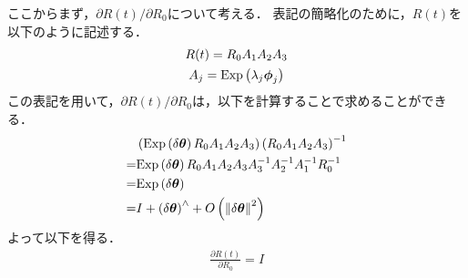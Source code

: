 ここからまず，$\partial R(t) / \partial R_{0}$について考える．
表記の簡略化のために，$R(t)$を以下のように記述する．
%
\begin{align}
  \begin{gathered}
    R(t) = R_{0} A_{1} A_{2} A_{3} \\
    A_{j} = {\rm Exp} \left( \lambda_{j} \boldsymbol \phi_{j} \right)
  \end{gathered}
\end{align}
%
この表記を用いて，$\partial R(t) / \partial R_{0}$は，以下を計算することで求めることができる．
%
\begin{align}
  \begin{split}
    & \left( {\rm Exp} \left( \delta \boldsymbol \theta \right) R_{0} A_{1} A_{2} A_{3} \right) \left( R_{0} A_{1} A_{2} A_{3} \right)^{-1} \\
  = & {\rm Exp} \left( \delta \boldsymbol \theta \right) R_{0} A_{1} A_{2} A_{3} A_{3}^{-1} A_{2}^{-1} A_{1}^{-1} R_{0}^{-1} \\
  = & {\rm Exp} \left( \delta \boldsymbol \theta \right) \\
  = & I + \left( \delta \boldsymbol \theta \right)^{\wedge} + O \left( \left\| \delta \boldsymbol \theta \right\|^{2} \right)
  \end{split}
\end{align}
%
よって以下を得る．
%
\begin{align}
  \frac{ \partial R(t) }{ \partial R_{0} } = I
\end{align}
%

